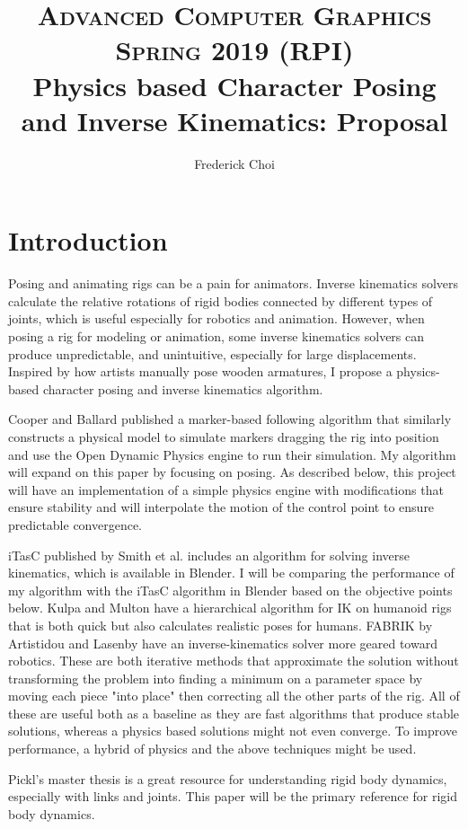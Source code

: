 \documentclass[10pt,twocolumn,letterpaper]{article}
\title{
        \usefont{OT1}{bch}{b}{n}
        \normalfont \normalsize \textsc{Advanced Computer Graphics Spring 2019 (RPI)} \\ [10pt]
        \huge Physics based Character Posing and Inverse Kinematics: Proposal \\
}
\author[0]{Frederick Choi}
\begin{document}
\maketitle


\section*{Introduction}
Posing and animating rigs can be a pain for animators. Inverse kinematics solvers calculate the relative rotations of rigid bodies connected by different types of joints, which is useful especially for robotics and animation. However, when posing a rig for modeling or animation, some inverse kinematics solvers can produce unpredictable, and unintuitive, especially for large displacements. Inspired by how artists manually pose wooden armatures, I propose a physics-based character posing and inverse kinematics algorithm.

Cooper and Ballard \cite{Co} published a marker-based following algorithm that similarly constructs a physical model to simulate markers dragging the rig into position and use the Open Dynamic Physics engine to run their simulation. My algorithm will expand on this paper by focusing on posing. As described below, this project will have an implementation of a simple physics engine with modifications that ensure stability and will interpolate the motion of the control point to ensure predictable convergence.

iTasC published by Smith et al. \cite{Sm} includes an algorithm for solving inverse kinematics, which is available in Blender. I will be comparing the performance of my algorithm with the iTasC algorithm in Blender based on the objective points below. Kulpa and Multon \cite{Ku} have a hierarchical algorithm for IK on humanoid rigs that is both quick but also calculates realistic poses for humans. FABRIK by Artistidou and Lasenby \cite{Ar} have an inverse-kinematics solver more geared toward robotics. These are both iterative methods that approximate the solution without transforming the problem into finding a minimum on a parameter space by moving each piece "into place" then correcting all the other parts of the rig. All of these are useful both as a baseline as they are fast algorithms that produce stable solutions, whereas a physics based solutions might not even converge. To improve performance, a hybrid of physics and the above techniques might be used.

Pickl's master thesis \cite{Pi} is a great resource for understanding rigid body dynamics, especially with links and joints. This paper will be the primary reference for rigid body dynamics.
\end{document}
